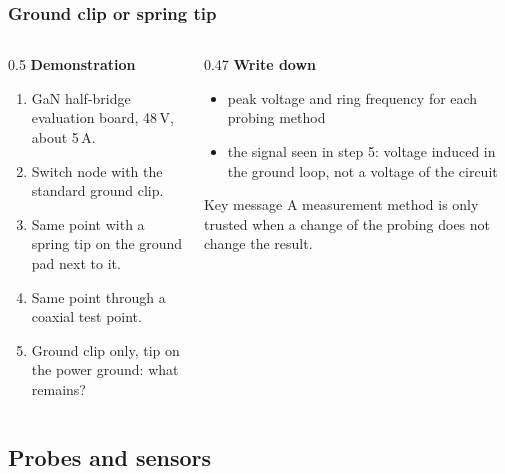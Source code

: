 \begin{frame}
	\frametitle{Ground clip or spring tip}
	\begin{columns}[T]
		\begin{column}{0.5\textwidth}
			\textbf{Demonstration}
			\begin{enumerate}
				\item GaN half-bridge evaluation board, 48\,V, about 5\,A.
				\item Switch node with the standard ground clip.
				\item Same point with a spring tip on the ground pad next to it.
				\item Same point through a coaxial test point.
				\item Ground clip only, tip on the power ground: what remains?
			\end{enumerate}
		\end{column}
		\begin{column}{0.47\textwidth}
			\textbf{Write down}
			\begin{itemize}
				\item peak voltage and ring frequency for each probing method
				\item the signal seen in step 5: voltage induced in the ground loop, not a voltage of the circuit
			\end{itemize}
			\begin{block}{Key message}
				A measurement method is only trusted when a change of the probing does not change the result.
			\end{block}
		\end{column}
	\end{columns}
\end{frame}

\subsection{Probes and sensors}

